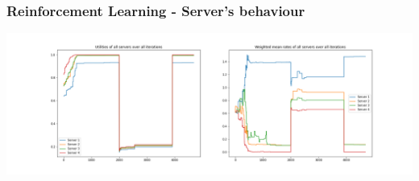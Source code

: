 \begin{frame}
    \frametitle{Reinforcement Learning - Server's behaviour}
    \centering

    \includegraphics[scale=0.3, trim=300 0 300 0]{Bin/reinforcemnet_learning/plot_3.png}    
    
\end{frame}